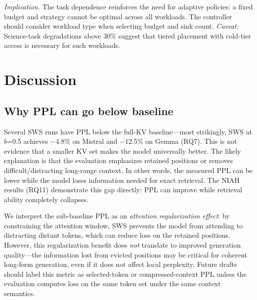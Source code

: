 \documentclass[11pt]{article}
\newcommand{\sws}{SWS}
\newcommand{\pct}{\%}
\theoremstyle{definition}
\theoremstyle{plain}
\begin{document}
\emph{Implication.}  The task dependence reinforces the need for adaptive policies: a fixed budget and strategy cannot be optimal across all workloads.  The controller should consider workload type when selecting budget and sink count.  \emph{Caveat:} Science-task degradations above 30\pct{} suggest that tiered placement with cold-tier access is necessary for such workloads.

\section{Discussion}
\label{sec:discussion}

\subsection{Why PPL can go below baseline}
Several \sws{} runs have PPL below the full-KV baseline---most strikingly, \sws{} at $b$=0.5 achieves $-$4.8\pct{} on Mistral and $-$12.5\pct{} on Gemma (RQ7).  This is not evidence that a smaller KV set makes the model universally better.  The likely explanation is that the evaluation emphasizes retained positions or removes difficult/distracting long-range context.  In other words, the measured PPL can be lower while the model loses information needed for exact retrieval.  The NIAH results (RQ11) demonstrate this gap directly: PPL can improve while retrieval ability completely collapses.

We interpret the sub-baseline PPL as an \emph{attention regularization effect}: by constraining the attention window, \sws{} prevents the model from attending to distracting distant tokens, which can reduce loss on the retained positions.  However, this regularization benefit does \emph{not} translate to improved generation quality---the information lost from evicted positions may be critical for coherent long-form generation, even if it does not affect local perplexity.  Future drafts should label this metric as selected-token or compressed-context PPL unless the evaluation computes loss on the same token set under the same context semantics.
\end{document}
